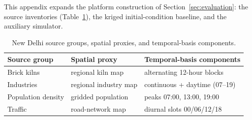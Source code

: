 This appendix expands the platform construction of
Section~\ref{sec:evaluation}: the source inventories
(Table~\ref{tab:new_delhi_inventories}), the kriged initial-condition baseline,
and the auxiliary simulator.

\begin{table}[t]
\centering
\small
\setlength{\tabcolsep}{4pt}
\caption{New Delhi source groups, spatial proxies, and temporal-basis components.}
\label{tab:new_delhi_inventories}
\begin{tabularx}{\columnwidth}{l
  >{\raggedright\arraybackslash}X
  >{\raggedright\arraybackslash}X}
\toprule
Source group & Spatial proxy & Temporal-basis components \\
\midrule
Brick kilns & regional kiln map & alternating 12-hour blocks \\
Industries & regional industry map & continuous + daytime (07--19) \\
Population density & gridded population & peaks 07:00, 13:00, 19:00 \\
Traffic & road-network map & diurnal slots 00/06/12/18 \\
\bottomrule
\end{tabularx}
\end{table}

